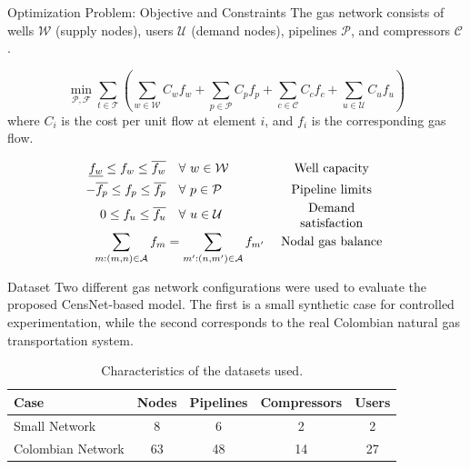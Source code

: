\documentclass[hyperref={colorlinks,citecolor=blue,linkcolor=blue,urlcolor=blue}]{beamer}
\begin{document}
\begin{frame}{Optimization Problem: Objective and Constraints}
\footnotesize
The gas network consists of wells $\mathcal{W}$ (supply nodes), users $\mathcal{U}$ (demand nodes), pipelines $\mathcal{P}$, and compressors $\mathcal{C}$.

\[
\min_{\mathcal{P}, \mathcal{F}} 
\sum_{t \in \mathcal{T}} \left(
\sum_{w \in \mathcal{W}} C_{w} f_{w} +
\sum_{p \in \mathcal{P}} C_{p} f_{p} +
\sum_{c \in \mathcal{C}} C_{c} f_{c} +
\sum_{u \in \mathcal{U}} C_{u} f_{u}
\right)
\]
where $C_i$ is the cost per unit flow at element $i$, and $f_i$ is the corresponding gas flow.

\begin{align}
    \underline{f_{w}} \leq f_{w} \leq \overline{f_{w}} 
    &\quad \forall \ w \in \mathcal{W} 
    &&\parbox{3cm}{\centering Well capacity} \label{eq:well_limits} \\
    -\overline{f_{p}} \leq f_{p} \leq \overline{f_{p}} 
    &\quad \forall \ p \in \mathcal{P} 
    &&\parbox{3cm}{\centering Pipeline limits} \label{eq:pipe_limits} \\
    0 \leq f_{u} \leq \overline{f_{u}} 
    &\quad \forall \ u \in \mathcal{U} 
    &&\parbox{3cm}{\centering Demand satisfaction} \label{eq:dem_limit_gas} \\
    \sum_{m:(m,n)\in\mathcal{A}} f_{m} 
    &= \sum_{m':(n,m')\in\mathcal{A}} f_{m'} 
    &&\parbox{3cm}{\centering Nodal gas balance} \label{eq:gas_balance}
\end{align}
\end{frame}


\begin{frame}{Dataset}
\footnotesize
Two different gas network configurations were used to evaluate the proposed CensNet-based model. 
The first is a small synthetic case for controlled experimentation, while the second corresponds 
to the real Colombian natural gas transportation system.

\begin{table}[H]
    \centering
    \begin{tabular}{lcccc}
        \toprule
        \textbf{Case} & \textbf{Nodes} & \textbf{Pipelines} & \textbf{Compressors} & \textbf{Users} \\
        \midrule
        Small Network & 8  & 6  & 2  & 2  \\
        Colombian Network & 63 & 48 & 14 & 27 \\
        \bottomrule
    \end{tabular}
    \caption{Characteristics of the datasets used.}
\end{table}
\end{frame}
%
\end{document}

